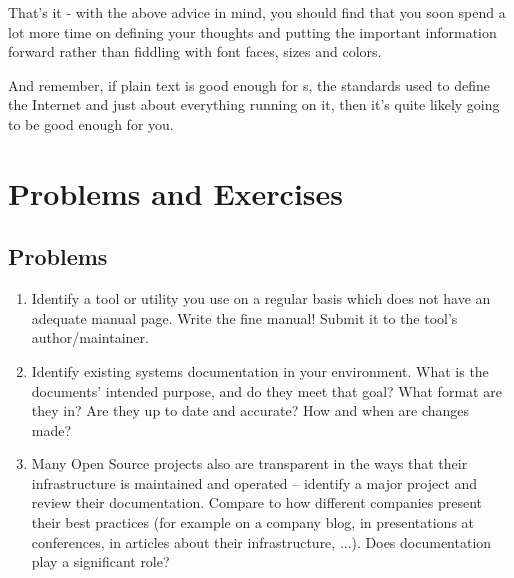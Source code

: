 That's it - with the above advice in mind, you should
find that you soon spend a lot more time on defining
your thoughts and putting the important information
forward rather than fiddling with font faces, sizes
and colors.

And remember, if plain text is good enough for
s, the standards used to define the
Internet and just about everything running on it, then
it's quite likely going to be good enough for you.

\vfill
\pagebreak

\chapter*{Problems and Exercises}
\section*{Problems}

\begin{enumerate}
\item
Identify a tool or utility you use on a regular basis which does not have
an adequate manual page.  Write the fine manual!  Submit it to the tool's
author/maintainer.

\item
Identify existing systems documentation in your environment.  What is the
documents' intended purpose, and do they meet that goal?  What format are
they in?  Are they up to date and accurate?  How and when are changes
made?

\item
Many Open Source projects also are transparent in the ways that their
infrastructure is maintained and operated -- identify a major project and
review their documentation.  Compare to how different companies present
their best practices (for example on a company blog, in presentations at
conferences, in articles about their infrastructure, ...).  Does
documentation play a significant role?

\end{enumerate}

\pagebreak

